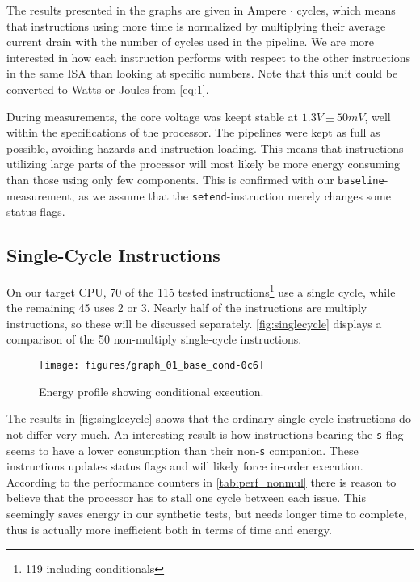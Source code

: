 The results presented in the graphs are given in Ampere $\cdot$ cycles, which
means that instructions using more time is normalized by multiplying their
average current drain with the number of cycles used in the pipeline. We are
more interested in how each instruction performs with respect to the other
instructions in the same ISA than looking at specific numbers. Note that this
unit could be converted to Watts or Joules from \autoref{eq:1}.

During measurements, the core voltage was keept stable at $1.3V\pm50mV$, well
within the specifications of the processor. The pipelines were kept as full as
possible, avoiding hazards and instruction loading. This means that instructions
utilizing large parts of the processor will most likely be more energy consuming
than those using only few components. This is confirmed with our
\texttt{baseline}-measurement, as we assume that the \texttt{setend}-instruction
merely changes some status flags.



\subsection{Single-Cycle Instructions}
On our target CPU, 70 of the 115 tested instructions\footnote{119 including
conditionals} use a single cycle, while the remaining 45 uses 2 or 3.  Nearly
half of the instructions are multiply instructions, so these will be discussed
separately. \autoref{fig:singlecycle} displays a comparison of the 50
non-multiply single-cycle instructions.

\begin{figure}
    \centering
    \texttt{[image: figures/graph\_01\_base\_cond-0c6]}
    \caption{Energy profile showing conditional execution.}
    \label{fig:cond}
\end{figure}

The results in \autoref{fig:singlecycle} shows that the ordinary single-cycle
instructions do not differ very much. An interesting result is how instructions
bearing the \texttt{s}-flag seems to have a lower consumption than their
non-\texttt{s} companion. These instructions updates status flags and will
likely force in-order execution.  According to the performance counters in
\autoref{tab:perf_nonmul} there is reason to believe that the processor has to
stall one cycle between each issue. This seemingly saves energy in our synthetic
tests, but needs longer time to complete, thus is actually more inefficient both
in terms of time and energy.

